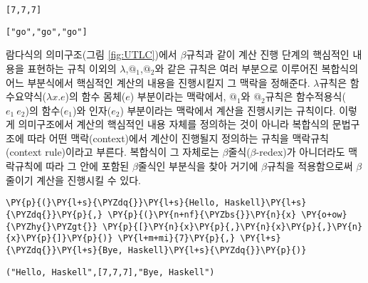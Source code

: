     
    \begin{Verbatim}[commandchars=\\\{\}]
[7,7,7]
    \end{Verbatim}

    
    
    \begin{Verbatim}[commandchars=\\\{\}]
["go","go","go"]
    \end{Verbatim}

    
    \vspace*{1ex}

람다식의 의미구조(그림 \ref{fig:UTLC})에서 \(\beta\)규칙과 같이 계산
진행 단계의 핵심적인 내용을 표현하는 규칙 이외의
\(\lambda\),\(\textrm{@}_1\),\(\textrm{@}_2\)와 같은 규칙은 여러
부분으로 이루어진 복합식의 어느 부분식에서 핵심적인 계산의 내용을
진행시킬지 그 맥락을 정해준다. \(\lambda\)규칙은
함수요약식(\(\lambda x.e\))의 함수 몸체(\(e\)) 부분이라는 맥락에서,
\(\textrm{@}_1\)와 \(\textrm{@}_2\)규칙은 함수적용식(\(e_1~e_2\))의
함수(\(e_1\))와 인자(\(e_2\)) 부분이라는 맥락에서 계산을 진행시키는
규칙이다. 이렇게 의미구조에서 계산의 핵심적인 내용 자체를 정의하는 것이
아니라 복합식의 문법구조에 따라 어떤 맥락(context)에서 계산이 진행될지
정의하는 규칙을 맥락규칙(context rule)이라고 부른다. 복합식이 그
자체로는 \(\beta\)줄식(\(\beta\)-redex)가 아니더라도 맥락규칙에 따라 그
안에 포함된 \(\beta\)줄식인 부분식을 찾아 거기에 \(\beta\)규칙을
적용함으로써 \(\beta\)줄이기 계산을 진행시킬 수 있다.

    \begin{tcolorbox}[breakable, size=fbox, boxrule=1pt, pad at break*=1mm,colback=cellbackground, colframe=cellborder]
\begin{Verbatim}[commandchars=\\\{\}]
\PY{p}{(}\PY{l+s}{\PYZdq{}}\PY{l+s}{Hello, Haskell}\PY{l+s}{\PYZdq{}}\PY{p}{,} \PY{p}{(}\PY{n+nf}{\PYZbs{}}\PY{n}{x} \PY{o+ow}{\PYZhy{}\PYZgt{}} \PY{p}{[}\PY{n}{x}\PY{p}{,}\PY{n}{x}\PY{p}{,}\PY{n}{x}\PY{p}{]}\PY{p}{)} \PY{l+m+mi}{7}\PY{p}{,} \PY{l+s}{\PYZdq{}}\PY{l+s}{Bye, Haskell}\PY{l+s}{\PYZdq{}}\PY{p}{)}
\end{Verbatim}
\end{tcolorbox}

    
    \begin{Verbatim}[commandchars=\\\{\}]
("Hello, Haskell",[7,7,7],"Bye, Haskell")
    \end{Verbatim}

